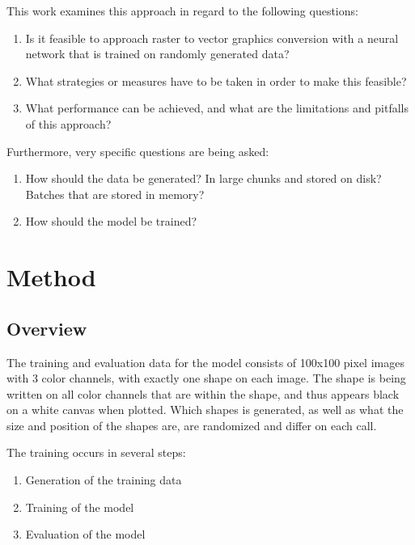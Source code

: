 \documentclass[12pt, a4paper, titlepage]{report}
\begin{document}
This work examines this approach in regard to the following questions:

\begin{enumerate}[label=\Roman*]
   \item Is it feasible to approach raster to vector graphics conversion with a neural network that is trained on randomly generated data?
   \item What strategies or measures have to be taken in order to make this feasible?
   \item What performance can be achieved, and what are the limitations and pitfalls of this approach?
\end{enumerate}


Furthermore, very specific questions are being asked:

\begin{enumerate}[label=\Roman*]
   \item How should the data be generated? In large chunks and stored on disk? Batches that are stored in memory?
   \item How should the model be trained?
\end{enumerate}




\chapter{Method}

\section{Overview}

The training and evaluation data for the model consists of 100x100 pixel images with 3 color channels, with exactly one shape on each image. The shape is being written on all color channels that are within the shape, and thus appears black on a white canvas when plotted. Which shapes is generated, as well as what the size and position of the shapes are, are randomized and differ on each call.

The training occurs in several steps:
\begin{enumerate}
   \item Generation of the training data
   \item Training of the model
   \item Evaluation of the model
\end{enumerate}
\end{document}
